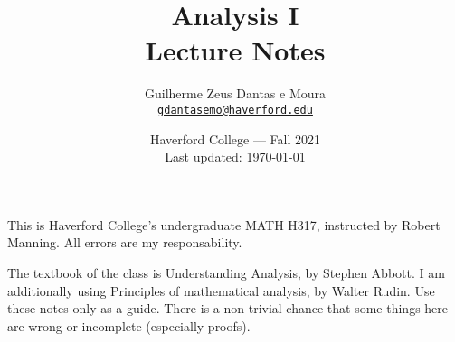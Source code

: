 \documentclass{scrbook}
\title{Analysis I\\Lecture Notes}
\author{Guilherme Zeus Dantas e Moura\\\href{mailto:gdantasemo@haverford.edu}{\texttt{gdantasemo@haverford.edu}}}
\date{Haverford College --- Fall 2021\\Last updated: \today}
\begin{document}
	\maketitle

		This is Haverford College's undergraduate MATH H317, instructed by Robert Manning.
		All errors are my responsability.

		The textbook of the class is Understanding Analysis, by Stephen Abbott. I am additionally using Principles of mathematical analysis, by Walter Rudin.
		Use these notes only as a guide. There is a non-trivial chance that some things here are wrong or incomplete (especially proofs).
	

		\tableofcontents
		\newpage

	
	
	
	
	
	
	
	
	
	
	
	
	
	
	
	
	
	
	
\end{document}
